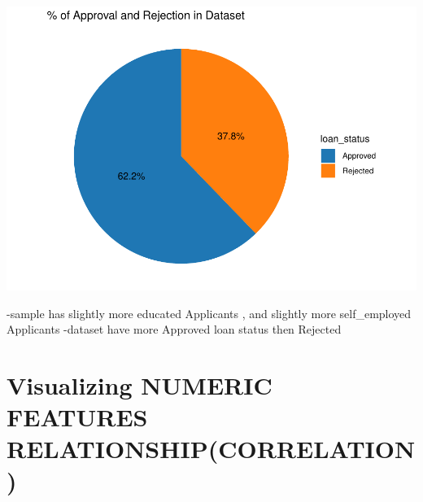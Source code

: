 \documentclass[
]{article}
\begin{document}
\includegraphics{Loan_approval_files/figure-latex/unnamed-chunk-17-1.pdf}

-sample has slightly more educated Applicants , and slightly more
self\_employed Applicants -dataset have more Approved loan status then
Rejected

\section{Visualizing NUMERIC FEATURES
RELATIONSHIP(CORRELATION)}\label{visualizing-numeric-features-relationshipcorrelation}
\end{document}

